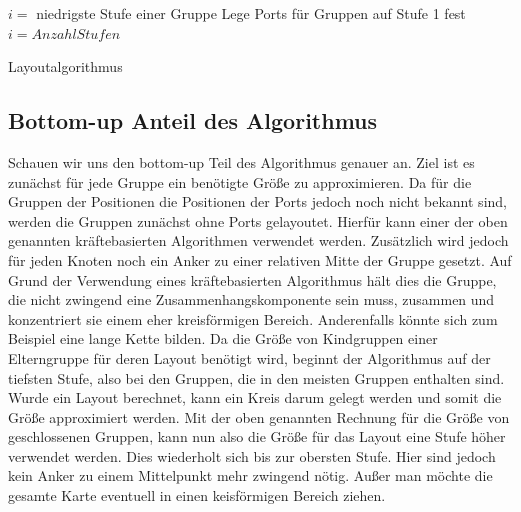 \begin{algorithm}[H]
\label{Layoutalgorithmus}
\SetAlgoLined
{} %
$i = $ niedrigste Stufe einer Gruppe \;
Lege Ports für Gruppen auf Stufe 1 fest\;
$i = Anzahl Stufen$\;
\caption{Layoutalgorithmus}
\end{algorithm}


\subsection{Bottom-up Anteil des Algorithmus}
Schauen wir uns den bottom-up Teil des Algorithmus genauer an. Ziel ist es zunächst für jede Gruppe ein benötigte Größe zu approximieren.
Da für die Gruppen der Positionen die Positionen der Ports jedoch noch nicht bekannt sind, werden die Gruppen zunächst ohne Ports gelayoutet.
Hierfür kann einer der oben genannten kräftebasierten Algorithmen verwendet werden. 
Zusätzlich wird jedoch für jeden Knoten noch ein Anker zu einer relativen Mitte der Gruppe gesetzt. 
Auf Grund der Verwendung eines kräftebasierten Algorithmus hält dies die Gruppe, die nicht zwingend eine Zusammenhangskomponente sein muss, zusammen 
und konzentriert sie einem eher kreisförmigen Bereich. Anderenfalls könnte sich zum Beispiel eine lange Kette bilden.
Da die Größe von Kindgruppen einer Elterngruppe für deren Layout benötigt wird, beginnt der Algorithmus auf der tiefsten Stufe,
also bei den Gruppen, die in den meisten Gruppen enthalten sind. Wurde ein Layout berechnet, kann ein Kreis darum gelegt werden und somit die Größe approximiert werden.
Mit der oben genannten Rechnung für die Größe von geschlossenen Gruppen, kann nun also die Größe für das Layout eine Stufe höher verwendet werden.
Dies wiederholt sich bis zur obersten Stufe. Hier sind jedoch kein Anker zu einem Mittelpunkt mehr zwingend nötig. 
Außer man möchte die gesamte Karte eventuell in einen keisförmigen Bereich ziehen.

